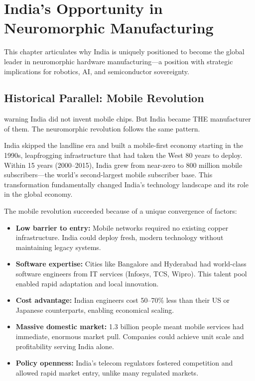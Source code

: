 \chapter{India's Opportunity in Neuromorphic Manufacturing}
\label{ch:india}

This chapter articulates why India is uniquely positioned to become the global leader in neuromorphic hardware manufacturing---a position with strategic implications for robotics, AI, and semiconductor sovereignty.

\section{Historical Parallel: Mobile Revolution}
\begin{block}{warning}
India did not invent mobile chips. But India became THE manufacturer of them. The neuromorphic revolution follows the same pattern.
\end{block}


India skipped the landline era and built a mobile-first economy starting in the 1990s, leapfrogging infrastructure that had taken the West 80 years to deploy. Within 15 years (2000--2015), India grew from near-zero to 800 million mobile subscribers---the world's second-largest mobile subscriber base. This transformation fundamentally changed India's technology landscape and its role in the global economy.

The mobile revolution succeeded because of a unique convergence of factors:
\begin{itemize}
\item \textbf{Low barrier to entry:} Mobile networks required no existing copper infrastructure. India could deploy fresh, modern technology without maintaining legacy systems.
\item \textbf{Software expertise:} Cities like Bangalore and Hyderabad had world-class software engineers from IT services (Infosys, TCS, Wipro). This talent pool enabled rapid adaptation and local innovation.
\item \textbf{Cost advantage:} Indian engineers cost 50--70\% less than their US or Japanese counterparts, enabling economical scaling.
\item \textbf{Massive domestic market:} 1.3 billion people meant mobile services had immediate, enormous market pull. Companies could achieve unit scale and profitability serving India alone.
\item \textbf{Policy openness:} India's telecom regulators fostered competition and allowed rapid market entry, unlike many regulated markets.
\end{itemize}

